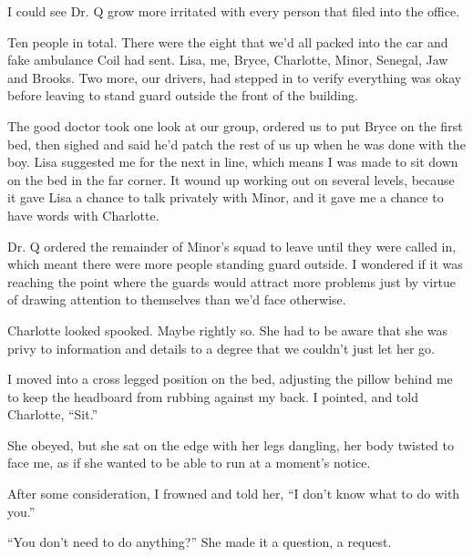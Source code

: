 





I could see Dr. Q grow more irritated with every person that filed into the office.



Ten people in total.  There were the eight that we'd all packed into the car and fake ambulance Coil had sent.  Lisa, me, Bryce, Charlotte, Minor, Senegal, Jaw and Brooks.  Two more, our drivers, had stepped in to verify everything was okay before leaving to stand guard outside the front of the building.



The good doctor took one look at our group, ordered us to put Bryce on the first bed, then sighed and said he'd patch the rest of us up when he was done with the boy.  Lisa suggested me for the next in line, which means I was made to sit down on the bed in the far corner.  It wound up working out on several levels, because it gave Lisa a chance to talk privately with Minor, and it gave me a chance to have words with Charlotte.



Dr. Q ordered the remainder of Minor's squad to leave until they were called in, which meant there were more people standing guard outside.  I wondered if it was reaching the point where the guards would attract more problems just by virtue of drawing attention to themselves than we'd face otherwise.



Charlotte looked spooked.  Maybe rightly so.  She had to be aware that she was privy to information and details to a degree that we couldn't just let her go.



I moved into a cross legged position on the bed, adjusting the pillow behind me to keep the headboard from rubbing against my back.  I pointed, and told Charlotte, ``Sit.''



She obeyed, but she sat on the edge with her legs dangling, her body twisted to face me, as if she wanted to be able to run at a moment's notice.



After some consideration, I frowned and told her, ``I don't know what to do with you.''



``You don't need to do anything?'' She made it a question, a request.



